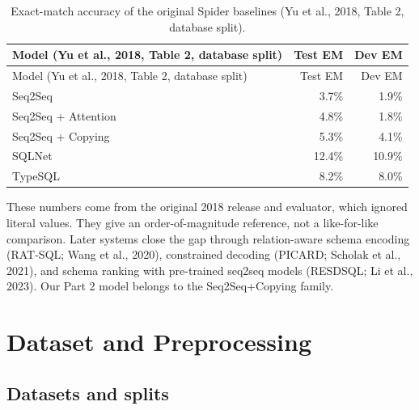 \documentclass[
  10pt,
]{article}
\begin{document}
\begin{longtable}[]{@{}lrr@{}}
\caption{Exact-match accuracy of the original Spider baselines (Yu et
al., 2018, Table 2, database split).}\tabularnewline
\toprule\noalign{}
Model (Yu et al., 2018, Table 2, database split) & Test EM & Dev EM \\
\midrule\noalign{}
\endfirsthead
\toprule\noalign{}
Model (Yu et al., 2018, Table 2, database split) & Test EM & Dev EM \\
\midrule\noalign{}
\endhead
\bottomrule\noalign{}
\endlastfoot
Seq2Seq & 3.7\% & 1.9\% \\
Seq2Seq + Attention & 4.8\% & 1.8\% \\
Seq2Seq + Copying & 5.3\% & 4.1\% \\
SQLNet & 12.4\% & 10.9\% \\
TypeSQL & 8.2\% & 8.0\% \\
\end{longtable}

These numbers come from the original 2018 release and evaluator, which
ignored literal values. They give an order-of-magnitude reference, not a
like-for-like comparison. Later systems close the gap through
relation-aware schema encoding (RAT-SQL; Wang et al., 2020), constrained
decoding (PICARD; Scholak et al., 2021), and schema ranking with
pre-trained seq2seq models (RESDSQL; Li et al., 2023). Our Part 2 model
belongs to the Seq2Seq+Copying family.

\section{Dataset and Preprocessing}\label{dataset-and-preprocessing}

\subsection{Datasets and splits}\label{datasets-and-splits}
\end{document}
